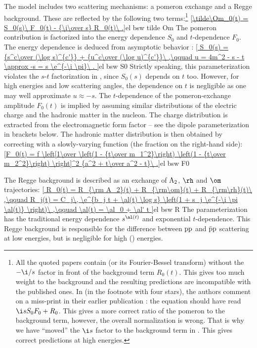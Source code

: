 The model includes two scattering mechanisms: a pomeron exchange and a Regge background. These are reflected by the following two terms:\footnote{%
All the quoted papers contain  (or its Fourier-Bessel transform) without the $-\i/s$ factor in front of the background term $R_0(t)$. This gives too much weight to the background and the resulting predictions are incompatible with the published ones. In  (in the footnote with four stars), the authors comment on a miss-print in their earlier publication : the equation should have read $\i s S_0 F_0 + R_0$. This gives a more correct ratio of the pomeron to the background term, however, the overall normalization is wrong. That is why we have ``moved'' the $\i s$ factor to the background term in . This gives correct predictions at high energies.
}
\eqref{\tilde\Om_0(t) = S_0(s)\ F_0(t) - {\i\over s} R_0(t)\ .}{el bsw tilde Om}
The pomeron contribution is factorized into the energy dependence $S_0$ and $t$-dependence $F_0$. The energy dependence is deduced from asymptotic  behavior :
\eqref{
	S_0(s) = {s^c\over (\log s)^{c'}} + {u^c\over (\log u)^{c'}}\ ,\qquad
	u = 4m^2 - s - t \approx -s = s \e^{-\i \pi}\ .
}{el bsw S0}
Strictly speaking, this parameterization violates the $s$-$t$ factorization in , since $S_0(s)$ depends on $t$ too. However, for high energies and low scattering angles, the dependence on $t$ is negligible as one may well approximate $u \approx -s$. The $t$-dependence of the pomeron-exchange amplitude $F_0(t)$ is implied by assuming similar distributions of the electric charge and the hadronic matter in the nucleon. The charge distribution is extracted from the electromagnetic form factor -- see the dipole parameterization in brackets below. The hadronic matter distribution is then obtained by correcting with a slowly-varying function (the fraction on the right-hand side):
\eqref{F_0(t) = f \left[1\over \left(1 - {t\over m_1^2}\right) \left(1 - {t\over m_2^2}\right) \right]^2 {a^2 + t\over a^2 - t}\ .}{el bsw F0}

The Regge background is described as an exchange of $\rm A_2$, $\rm \rh$ and $\rm \om$ trajectories:
\eqref{
	R_0(t) = R_{\rm A_2}(t) + R_{\rm\om}(t) + R_{\rm\rh}(t)\ ,\qquad
	R_j(t) = C_j\, \e^{b_j t + \al(t) \log s} \left(1 + s_j \e^{-\i \pi \al(t)} \right)\ ,\qquad
	\al(t) = \al_0 + \al' t
}{el bsw R}
The parameterization has the traditional energy dependence $s^{\al(t)}$ and exponential $t$-dependence. This Regge background is responsible for the difference between $\rm pp$ and $\rm\bar pp$ scattering at low energies, but is negligible for high () energies.

